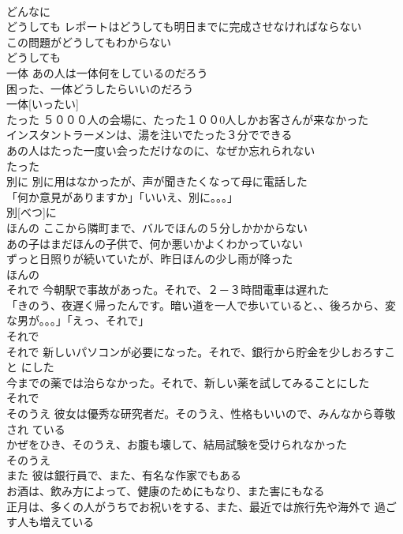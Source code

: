 \documentclass[8pt]{extreport}
\begin{document}
\begin{CJK}{UTF8}{min}
\\	どんなに			
\\	どうしても	レポートはどうしても明日までに完成させなければならない 
\\	この問題がどうしてもわからない 
\\	どうしても			
\\	一体	あの人は一体何をしているのだろう 
\\	困った、一体どうしたらいいのだろう 
\\	一体[いったい]			
\\	たった	５０００人の会場に、たった１００0人しかお客さんが来なかった 
\\	インスタントラーメンは、湯を注いでたった３分でできる 
\\	あの人はたった一度い会っただけなのに、なぜか忘れられない 
\\	たった			
\\	別に	別に用はなかったが、声が聞きたくなって母に電話した 
\\	「何か意見がありますか」「いいえ、別に。。。」 
\\	別[べつ]に			
\\	ほんの	ここから隣町まで、バルでほんの５分しかかからない 
\\	あの子はまだほんの子供で、何か悪いかよくわかっていない 
\\	ずっと日照りが続いていたが、昨日ほんの少し雨が降った 
\\	ほんの			
\\	それで	今朝駅で事故があった。それで、２－３時間電車は遅れた 
\\	「きのう、夜遅く帰ったんです。暗い道を一人で歩いていると、、後ろから、変な男が。。。」「えっ、それで」 
\\	それで			
\\	それで	新しいパソコンが必要になった。それで、銀行から貯金を少しおろすこと にした 
\\	今までの薬では治らなかった。それで、新しい薬を試してみることにした 
\\	それで			
\\	そのうえ	彼女は優秀な研究者だ。そのうえ、性格もいいので、みんなから尊敬され ている 
\\	かぜをひき、そのうえ、お腹も壊して、結局試験を受けられなかった 
\\	そのうえ			
\\	また	彼は銀行員で、また、有名な作家でもある 
\\	お酒は、飲み方によって、健康のためにもなり、また害にもなる 
\\	正月は、多くの人がうちでお祝いをする、また、最近では旅行先や海外で 過ごす人も増えている 

\end{CJK}
\end{document}
